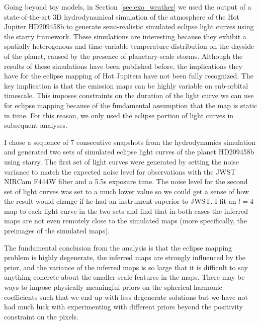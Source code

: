 \documentclass[12pt,dvipsnames]{report}
\newcommand{\ssf}[1]{\textsf{#1}}
\begin{document}
Going beyond toy models, in Section~\ref{sec:exo_weather} we used the output of a state-of-the-art 
3D hydrodynamical simulation of the atmosphere of the Hot Jupiter HD209458b to generate
semi-realistic simulated eclipse light curves using the \ssf{starry} framework. 
These simulations are interesting 
because they exhibit a spatially heterogenous and time-variable temperature distribution 
on the dayside of the planet, caused by the presence of planetary-scale storms. Although 
the results of these simulations have been published before, the implications they have 
for the eclipse mapping of Hot Jupiters have not been fully recognized. The key implication 
is that the emission maps can be highly variable on sub-orbital 
timescale. This imposes constraints on the duration of the light curve we can use for 
eclipse mapping because of the fundamental assumption that the map is static in time. 
For this reason, we only used the eclipse portion of light curves in subsequent analyses.

I chose a sequence of 7 consecutive snapshots from the hydrodynamics simulation and generated two sets
of simulated eclipse light curves of the planet HD209458b using \ssf{starry}. 
The first set of light curves were generated by setting the noise variance to match the expected 
noise level for observations with the JWST NIRCam F444W filter and a 5.5s exposure time.
The noise level for the second set of light curves was set to a much lower value so we could 
get a sense of how the result would change if he had an instrument superior to JWST.
I fit an $l=4$ map to each light curve in the two sets and find
that in both cases the inferred maps are not even remotely close to the simulated maps 
(more specifically, the preimages of the simulated maps). 


The fundamental conclusion from the analysis is that the eclipse mapping
problem is highly degenerate, the inferred maps are strongly influenced by the prior, and
the variance of the inferred maps is so large that it is difficult to say 
anything concrete about the smaller scale features in the maps.
There may be ways to impose physically meaningful priors on the 
spherical harmonic coefficients such that we end up with less degenerate solutions but we have not 
had much luck with experimenting with different priors beyond the positivity constraint on the 
pixels. %
\end{document}
